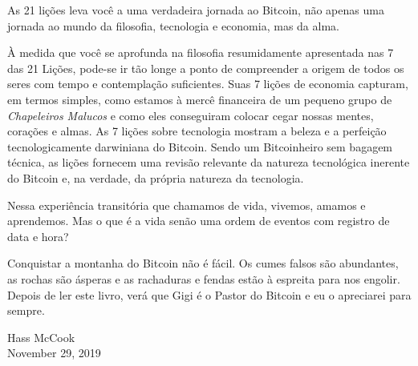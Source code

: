 As 21 lições leva você a uma verdadeira jornada ao Bitcoin, não apenas uma jornada ao mundo da filosofia, tecnologia e economia, mas da alma.

À medida que você se aprofunda na filosofia resumidamente apresentada nas 7 das 21 Lições, pode-se ir tão longe a ponto de compreender a origem de todos os seres com tempo e contemplação suficientes. Suas 7 lições de economia capturam, em termos simples, como estamos à mercê financeira de um pequeno grupo de \textit{Chapeleiros Malucos} e como eles conseguiram colocar cegar nossas mentes, corações e almas. As 7 lições sobre tecnologia mostram a beleza e a perfeição tecnologicamente darwiniana do Bitcoin. Sendo um Bitcoinheiro sem bagagem técnica, as lições fornecem uma revisão relevante da natureza tecnológica inerente do Bitcoin e, na verdade, da própria natureza da tecnologia.

Nessa experiência transitória que chamamos de vida, vivemos, amamos e aprendemos. Mas o que é a vida senão uma ordem de eventos com registro de data e hora?

Conquistar a montanha do Bitcoin não é fácil. Os cumes falsos são abundantes, as rochas são ásperas e as rachaduras e fendas estão à espreita para nos engolir. Depois de ler este livro, verá que Gigi é o Pastor do Bitcoin e eu o apreciarei para sempre.

\begin{flushright}
  Hass McCook \\
  November 29, 2019
\end{flushright}
